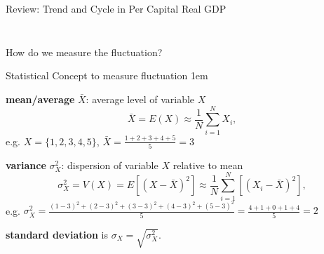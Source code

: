 \documentclass[11pt,aspectratio=43]{beamer}
\let\olditemize=\itemize
\let\endolditemize=\enditemize
\renewenvironment{itemize}{\olditemize \itemsep1em}{\endolditemize}
\theoremstyle{definition}
\begin{document}
\begin{frame}{Review: Trend and Cycle in Per Capital Real GDP}
\begin{columns}
\begin{column}{0.5\textwidth}
\begin{figure}
        \end{figure}
    \end{column}
\end{columns}
\begin{center}
    How do we measure the fluctuation?
\end{center}
\end{frame}

\begin{frame}{Statistical Concept to measure fluctuation}
\label{slide:Statistical_Concept}
    \begin{itemize}
        \item \textbf{mean/average} $ \bar{X} $: average level of variable $ X $
        \begin{equation}
        \label{eq:average}
            \bar{X} = E( X ) \approx \frac{1}{N} \sum_{i=1}^{N} X_{i}
        ,\end{equation}
        e.g. $ X = \{ 1, 2, 3, 4, 5 \} $, $ \bar{X} = \frac{1+2+3+4+5}{5} = 3 $
        \item \textbf{variance} $ \sigma_{X}^{2} $: dispersion of variable $ X $ relative to mean
        \begin{equation}
        \label{eq:variance}
            \sigma_{X}^{2} = V( X ) = E[ ( X - \bar{X} )^{2} ] \approx \frac{1}{N} \sum_{i=1}^{N} [ ( X_{i} - \bar{X} )^{2} ]
        ,\end{equation}
        e.g. $ \sigma_{X}^{2} = \frac{( 1-3 )^{2} + ( 2-3 )^{2} + ( 3-3 )^{2} + ( 4-3 )^{2} + ( 5-3 )^{2}}{5} = \frac{4 + 1 + 0 + 1 + 4}{5} = 2  $

        \textbf{standard deviation} is $ \sigma_{X} = \sqrt{\sigma_{X}^{2}} $.

    \end{itemize}
\end{frame}
\end{document}

